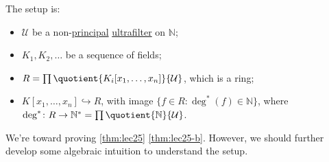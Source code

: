 \begin{prev}
	The setup is:
	\begin{itemize}
		\item \(\mathcal{U} \) be a non-\hyperref[eg:principal-filter]{principal} \hyperref[def:ultrafilter]{ultrafilter} on \(\mathbb{N} \);
		\item \(K_1, K_2, \dots \) be a sequence of fields;
		\item \(R = \prod \quotient{K_i[x_1, \dots , x_n]}{\mathcal{U} } \), which is a ring;
		\item \(K[x_1, \dots , x_n] \hookrightarrow R\), with image \(\{ f\in R \colon \deg^{\ast} (f) \in \mathbb{N}\} \), where \(\deg^{\ast} \colon R \to \mathbb{N} ^{\ast} = \prod \quotient{\mathbb{N} }{\mathcal{U} } \).
	\end{itemize}
\end{prev}

We're toward proving \autoref{thm:lec25} \autoref{thm:lec25-b}. However, we should further develop some algebraic intuition to understand the setup.

